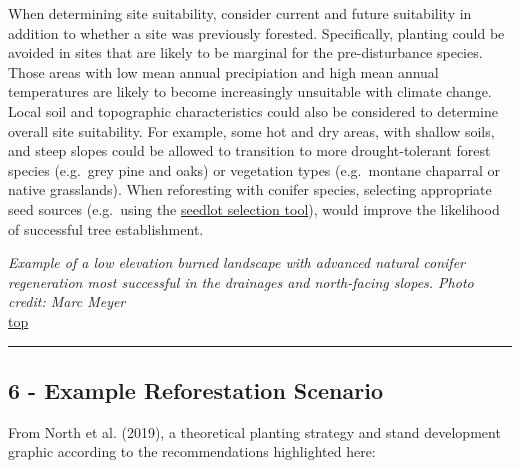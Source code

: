 \documentclass[]{article}
\begin{document}
When determining site suitability, consider current and future
suitability in addition to whether a site was previously forested.
Specifically, planting could be avoided in sites that are likely to be
marginal for the pre-disturbance species. Those areas with low mean
annual precipiation and high mean annual temperatures are likely to
become increasingly unsuitable with climate change. Local soil and
topographic characteristics could also be considered to determine
overall site suitability. For example, some hot and dry areas, with
shallow soils, and steep slopes could be allowed to transition to more
drought-tolerant forest species (e.g.~grey pine and oaks) or vegetation
types (e.g.~montane chaparral or native grasslands). When reforesting
with conifer species, selecting appropriate seed sources (e.g.~using the
\href{https://seedlotselectiontool.org/sst/}{seedlot selection tool}),
would improve the likelihood of successful tree establishment.

 \emph{Example of a low elevation burned landscape with advanced natural
conifer regeneration most successful in the drainages and north-facing
slopes. Photo credit: Marc Meyer}\\

\protect\hyperlink{top}{top}

\begin{center}\rule{0.5\linewidth}{\linethickness}\end{center}

\hypertarget{Link6}{\subsection{6 - Example Reforestation
Scenario}\label{Link6}}

From North et al. (2019), a theoretical planting strategy and stand
development graphic according to the recommendations highlighted here:
\end{document}
